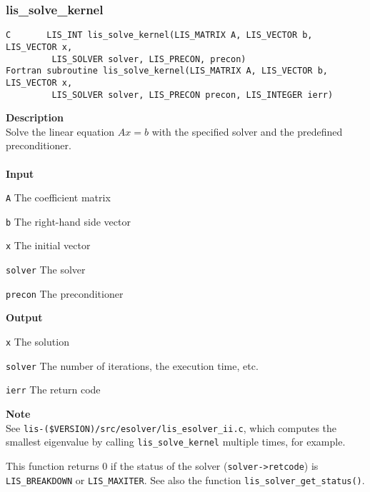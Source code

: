 \documentclass[a4paper]{article}
\newcommand{\namelistlabel}[1]{\mbox{#1}\hfill}
\newenvironment{namelist}[1]{%
\begin{list}{}
  {\let\makelabel\namelistlabel
  \settowidth{\labelwidth}{#1}
  \setlength{\leftmargin}{1.1\labelwidth}}
  }{%
\end{list}}
\begin{document}
\subsubsection{lis\_solve\_kernel}
\begin{screen}
\verb|C       LIS_INT lis_solve_kernel(LIS_MATRIX A, LIS_VECTOR b, LIS_VECTOR x,|\\
\verb|         LIS_SOLVER solver, LIS_PRECON, precon)|\\
\verb|Fortran subroutine lis_solve_kernel(LIS_MATRIX A, LIS_VECTOR b, LIS_VECTOR x,|\\
\verb|         LIS_SOLVER solver, LIS_PRECON precon, LIS_INTEGER ierr)|
\end{screen}
{\bf Description}\\
\indent
Solve the linear equation $Ax = b$ with the specified solver and the predefined preconditioner.
\\ \\
\noindent
{\bf Input}
\begin{namelist}{XXXXXXXXXXXXXXXXXXXX}
\item[\tt A] The coefficient matrix
\item[\tt b] The right-hand side vector
\item[\tt x] The initial vector
\item[\tt solver] The solver
\item[\tt precon] The preconditioner
\end{namelist}
{\bf Output}
\begin{namelist}{XXXXXXXXXXXXXXXXXXXX}
\item[\tt x] The solution
\item[\tt solver] The number of iterations, the execution time, etc.
\item[\tt ierr] The return code
\end{namelist}
{\bf Note}\\
\indent
See {\tt lis-(\$VERSION)/src/esolver/lis\_esolver\_ii.c}, 
which computes the smallest eigenvalue by calling 
\verb|lis_solve_kernel| multiple times, for example. 

This function returns 0 if the status of the solver ({\tt solver->retcode})
is {\tt LIS\_BREAKDOWN} or {\tt LIS\_MAXITER}. See also the function
{\tt lis\_solver\_get\_status()}. 

\newpage
\end{document}
